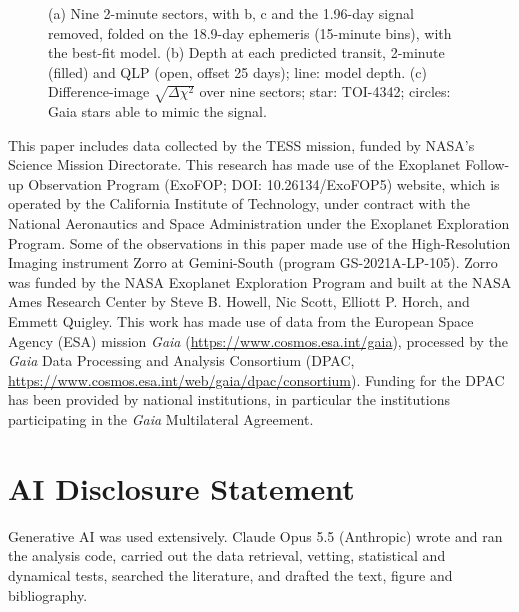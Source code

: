 \documentclass{aastex701}
\begin{document}
\begin{figure}[ht!]
\caption{(a) Nine 2-minute sectors, with b, c and the 1.96-day signal removed, folded on the 18.9-day ephemeris (15-minute bins), with the best-fit model. (b) Depth at each predicted transit, 2-minute (filled) and QLP (open, offset 25 days); line: model depth. (c) Difference-image $\sqrt{\Delta\chi^2}$ over nine sectors; star: TOI-4342; circles: Gaia stars able to mimic the signal.\label{fig:1}}
\end{figure}

\begin{acknowledgments}
This paper includes data collected by the TESS mission, funded by NASA's Science Mission Directorate. This research has made use of the Exoplanet Follow-up Observation Program (ExoFOP; DOI: 10.26134/ExoFOP5) website, which is operated by the California Institute of Technology, under contract with the National Aeronautics and Space Administration under the Exoplanet Exploration Program. Some of the observations in this paper made use of the High-Resolution Imaging instrument Zorro at Gemini-South (program GS-2021A-LP-105). Zorro was funded by the NASA Exoplanet Exploration Program and built at the NASA Ames Research Center by Steve B. Howell, Nic Scott, Elliott P. Horch, and Emmett Quigley. This work has made use of data from the European Space Agency (ESA) mission {\it Gaia} (\url{https://www.cosmos.esa.int/gaia}), processed by the {\it Gaia} Data Processing and Analysis Consortium (DPAC, \url{https://www.cosmos.esa.int/web/gaia/dpac/consortium}). Funding for the DPAC has been provided by national institutions, in particular the institutions participating in the {\it Gaia} Multilateral Agreement.
\end{acknowledgments}

\section*{AI Disclosure Statement}
Generative AI was used extensively. Claude Opus 5.5 (Anthropic) wrote and ran the analysis code, carried out the data retrieval, vetting, statistical and dynamical tests, searched the literature, and drafted the text, figure and bibliography.



{}

\end{document}
